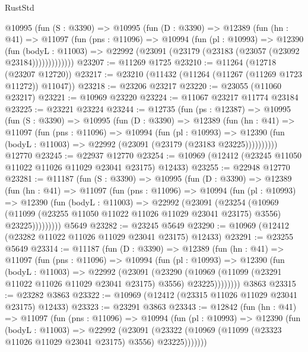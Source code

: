 \begin{lexlean}{RustStd}
\begin{coremodule}
      @10995
        (fun (S : @3390) =>
        @10995
          (fun (D : @3390) =>
          @12389
            (fun (hn : @41) =>
            @11097
              (fun (pns : @11096) =>
              @10994
                (fun (pl : @10993) =>
                @12390
                  (fun (bodyL : @11003) =>
                  @22992 (@23091 (@23179 (@23183 (@23057 (@23092 @23184)))))))))))))
@23207 := @11269 @1725
@23210 := @11264 (@12718 (@23207 @12720))
@23217 := @23210 (@11432 (@11264 (@11267 (@11269 @1723 @11272)) @11047))
@23218 := @23206 @23217
@23220 := @23055 (@11060 @23217)
@23221 := @10969 @23220
@23224 := @11067 @23217 @11774 @23184
@23225 := @23221 @23224
@23244 := @12735
    (fun (ps : @12387) =>
    @10995
      (fun (S : @3390) =>
      @10995
        (fun (D : @3390) =>
        @12389
          (fun (hn : @41) =>
          @11097
            (fun (pns : @11096) =>
            @10994
              (fun (pl : @10993) =>
              @12390 (fun (bodyL : @11003) => @22992 (@23091 (@23179 (@23183 @23225))))))))))
    @12770
@23245 := @22937 @12770
@23254 := @10969 (@12412 (@23245 @11050 @11022 @11026 @11029 @23041 @23175) @12433)
@23255 := @22948 @12770
@23281 := @11187
    (fun (S : @3390) =>
    @10995
      (fun (D : @3390) =>
      @12389
        (fun (hn : @41) =>
        @11097
          (fun (pns : @11096) =>
          @10994
            (fun (pl : @10993) =>
            @12390
              (fun (bodyL : @11003) =>
              @22992
                (@23091
                  (@23254
                    (@10969
                      (@11099 (@23255 @11050 @11022 @11026 @11029 @23041 @23175) @3556)
                      @23225)))))))))
    @5649
@23282 := @23245 @5649
@23290 := @10969 (@12412 (@23282 @11022 @11026 @11029 @23041 @23175) @12433)
@23291 := @23255 @5649
@23314 := @11187
    (fun (D : @3390) =>
    @12389
      (fun (hn : @41) =>
      @11097
        (fun (pns : @11096) =>
        @10994
          (fun (pl : @10993) =>
          @12390
            (fun (bodyL : @11003) =>
            @22992
              (@23091
                (@23290
                  (@10969 (@11099 (@23291 @11022 @11026 @11029 @23041 @23175) @3556) @23225))))))))
    @3863
@23315 := @23282 @3863
@23322 := @10969 (@12412 (@23315 @11026 @11029 @23041 @23175) @12433)
@23323 := @23291 @3863
@23343 := @12842
    (fun (hn : @41) =>
    @11097
      (fun (pns : @11096) =>
      @10994
        (fun (pl : @10993) =>
        @12390
          (fun (bodyL : @11003) =>
          @22992
            (@23091
              (@23322 (@10969 (@11099 (@23323 @11026 @11029 @23041 @23175) @3556) @23225)))))))

\end{coremodule}
\end{lexlean}

